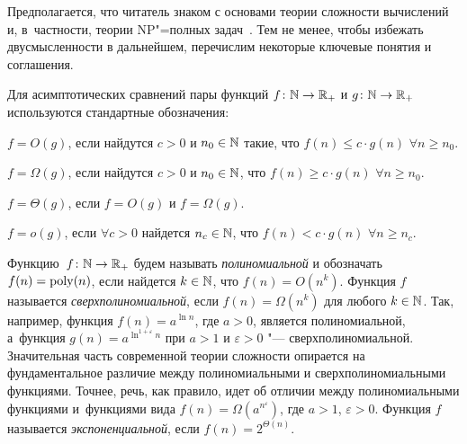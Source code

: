 Предполагается, что читатель знаком с основами теории сложности вычислений~\cite{Arora:2009, Goldreich:2008} и, в~частности, теории NP"=полных задач~\cite{Garey:1982}.
Тем не менее, чтобы избежать двусмысленности в дальнейшем, перечислим некоторые ключевые понятия и соглашения.

Для асимптотических сравнений пары функций $f\colon \mathbb{N} \to \mathbb{R}_+$ и $g\colon \mathbb{N} \to \mathbb{R}_+$ используются стандартные обозначения:

$f = O(g)$, если найдутся $c > 0$ и $n_0 \in \mathbb{N}$ такие, что $f(n) \le c \cdot g(n)$ $\forall n \ge n_0$.

$f = \Omega(g)$, если найдутся $c > 0$ и $n_0 \in \mathbb{N}$, что $f(n) \ge c \cdot g(n)$ $\forall n \ge n_0$.

$f = \Theta(g)$, если $f = O(g)$ и $f = \Omega(g)$.

$f = o(g)$, если $\forall c > 0$ найдется $n_c \in \mathbb{N}$, что $f(n) < c \cdot g(n)$ $\forall n \ge n_c$.

Функцию~$f\colon \mathbb{N} \to \mathbb{R}_+$ будем называть \emph{полиномиальной} и обозначать $f(n) = \operatorname{poly}(n)$,
если найдется $k \in \mathbb{N}$, что $f(n) = O(n^k)$.
Функция $f$ называется \emph{сверхполиномиальной},
если $f(n) = \Omega(n^k)$ для любого $k \in \mathbb{N}$. 
Так, например, функция $f(n) = a^{\ln n}$, где $a > 0$, является полиномиальной, а~функция $g(n) = a^{\ln^{1+\varepsilon} n}$ при $a > 1$ и $\varepsilon > 0$ "--- сверхполиномиальной.
Значительная часть современной теории сложности опирается на фундаментальное различие между полиномиальными и сверхполиномиальными функциями.
Точнее, речь, как правило, идет об отличии между полиномиальными функциями и~функциями вида $f(n) = \Omega\left(a^{n^{\varepsilon}}\right)$,
 где $a > 1$, $\varepsilon > 0$.
Функция $f$ называется \emph{экспоненциальной},
если $f(n) = 2^{\Theta(n)}$.

